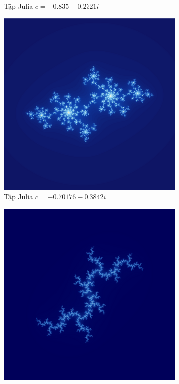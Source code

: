 \documentclass[oneside,final]{report}
\begin{document}
\begin{figure}[H]
\begin{subfigure}[b]{0.3\textwidth}
        \caption{Tập Julia $c=-0.835-0.2321i$}
        \label{fig:julia_set_4}
    \end{subfigure}
    \begin{subfigure}[b]{0.3\textwidth}
      \centering
      \includegraphics[width=\textwidth]{assets/images/julia_-0.70176_-0.3842.png} 
      \caption{Tập Julia $c=-0.70176-0.3842i$}
      \label{fig:julia_set_5}
  \end{subfigure}
  \begin{subfigure}[b]{0.3\textwidth}
    \centering
    \includegraphics[width=\textwidth]{assets/images/Julia_0_0.8.png} 

\end{subfigure}
\end{figure}
\end{document}
